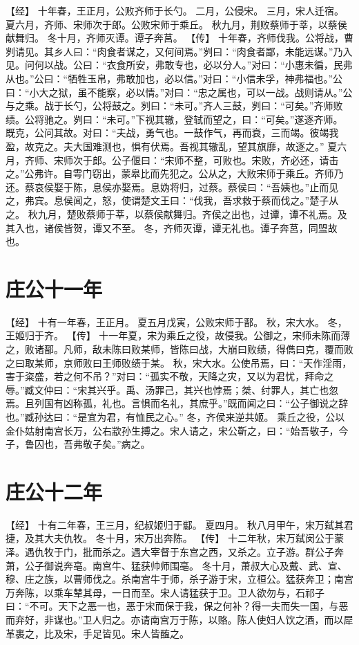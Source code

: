 \documentclass[a4paper,12pt,UTF8,twoside]{ctexbook}
\begin{document}
【经】
十年春，王正月，公败齐师于长勺。
二月，公侵宋。
三月，宋人迁宿。
夏六月，齐师、宋师次于郎。公败宋师于乘丘。
秋九月，荆败蔡师于莘，以蔡侯献舞归。
冬十月，齐师灭谭。谭子奔莒。
【传】
十年春，齐师伐我。公将战，曹刿请见。其乡人曰：“肉食者谋之，又何间焉。”刿曰：“肉食者鄙，未能远谋。”乃入见。问何以战。公曰：“衣食所安，弗敢专也，必以分人。”对曰：“小惠未徧，民弗从也。”公曰：“牺牲玉帛，弗敢加也，必以信。”对曰：“小信未孚，神弗福也。”公曰：“小大之狱，虽不能察，必以情。”对曰：“忠之属也，可以一战。战则请从。”公与之乘。战于长勺，公将鼓之。刿曰：“未可。”齐人三鼓，刿曰：“可矣。”齐师败绩。公将驰之。刿曰：“未可。”下视其辙，登轼而望之，曰：“可矣。”遂逐齐师。
既克，公问其故。对曰：“夫战，勇气也。一鼓作气，再而衰，三而竭。彼竭我盈，故克之。夫大国难测也，惧有伏焉。吾视其辙乱，望其旗靡，故逐之。”
夏六月，齐师、宋师次于郎。公子偃曰：“宋师不整，可败也。宋败，齐必还，请击之。”公弗许。自雩门窃出，蒙皋比而先犯之。公从之，大败宋师于乘丘。齐师乃还。蔡哀侯娶于陈，息侯亦娶焉。息妫将归，过蔡。蔡侯曰：“吾姨也。”止而见之，弗宾。息侯闻之，怒，使谓楚文王曰：“伐我，吾求救于蔡而伐之。”楚子从之。
秋九月，楚败蔡师于莘，以蔡侯献舞归。齐侯之出也，过谭，谭不礼焉。及其入也，诸侯皆贺，谭又不至。
冬，齐师灭谭，谭无礼也。谭子奔莒，同盟故也。

\chapter{庄公十一年}

【经】
十有一年春，王正月。
夏五月戊寅，公败宋师于鄑。
秋，宋大水。
冬，王姬归于齐。
【传】
十一年夏，宋为乘丘之役，故侵我。公御之，宋师未陈而薄之，败诸鄑。凡师，敌未陈曰败某师，皆陈曰战，大崩曰败绩，得儁曰克，覆而败之曰取某师，京师败曰王师败绩于某。
秋，宋大水。公使吊焉，曰：“天作淫雨，害于粢盛，若之何不吊？”对曰：“孤实不敬，天降之灾，又以为君忧，拜命之辱。”臧文仲曰：“宋其兴乎。禹、汤罪己，其兴也悖焉；桀、纣罪人，其亡也忽焉。且列国有凶称孤，礼也。言惧而名礼，其庶乎。”既而闻之曰：“公子御说之辞也。”臧孙达曰：“是宜为君，有恤民之心。”
冬，齐侯来逆共姬。
乘丘之役，公以金仆姑射南宫长万，公右歂孙生搏之。宋人请之，宋公靳之，曰：“始吾敬子，今子，鲁囚也，吾弗敬子矣。”病之。

\chapter{庄公十二年}

【经】
十有二年春，王三月，纪叔姬归于酅。
夏四月。
秋八月甲午，宋万弑其君捷，及其大夫仇牧。
冬十月，宋万出奔陈。
【传】
十二年秋，宋万弑闵公于蒙泽。遇仇牧于门，批而杀之。遇大宰督于东宫之西，又杀之。立子游。群公子奔萧，公子御说奔亳。南宫牛、猛获帅师围亳。
冬十月，萧叔大心及戴、武、宣、穆、庄之族，以曹师伐之。杀南宫牛于师，杀子游于宋，立桓公。猛获奔卫；南宫万奔陈，以乘车辇其母，一日而至。宋人请猛获于卫。卫人欲勿与，石祁子曰：“不可。天下之恶一也，恶于宋而保于我，保之何补？得一夫而失一国，与恶而弃好，非谋也。”卫人归之。亦请南宫万于陈，以赂。陈人使妇人饮之酒，而以犀革裹之，比及宋，手足皆见。宋人皆醢之。
\end{document}
